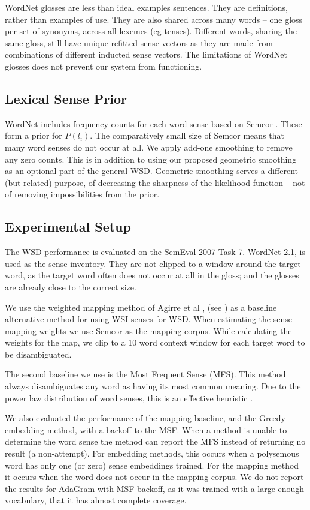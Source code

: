 \documentclass{llncs}
\def\parencite{\cite}
\begin{document}
WordNet glosses are less than ideal examples sentences.
They are definitions, rather than examples of use.
They are also shared across many words -- one gloss per set of synonyms, across all lexemes (eg tenses).
Different words, sharing the same gloss, still have unique refitted sense vectors as they are made from combinations of different inducted sense vectors.
The limitations of WordNet glosses does not prevent our system from functioning.

\subsection{Lexical Sense Prior}
WordNet includes frequency counts for each word sense based on Semcor \parencite{tengi1998design}.
These form a prior for $P(l_i)$.
The comparatively small size of Semcor means that many word senses do not occur at all.
We apply add-one smoothing to remove any zero counts.
This is in addition to using our proposed geometric smoothing as an optional part of the general WSD.
Geometric smoothing serves a different (but related) purpose, of decreasing the sharpness of the likelihood function -- not of removing impossibilities from the prior.

\subsection {Experimental Setup}
The WSD performance is evaluated on the SemEval 2007 Task 7. 
WordNet 2.1, is used as the sense inventory.
They are not clipped to a window around the target word, as the target word often does not occur at all in the gloss; and the glosses are already close to the correct size.

We use the weighted mapping method of Agirre et al \parencite{agirre2006}, (see ) as a baseline alternative method for using WSI senses for WSD.
When estimating the sense mapping weights we use Semcor as the mapping corpus.
While calculating the weights for the map, we clip to a 10 word context window for each target word to be disambiguated.

The second baseline we use is the Most Frequent Sense (MFS).
This method always disambiguates any word as having its  most common meaning.
Due to the power law distribution of word senses, this is an effective heuristic \parencite{Kilgarriff2004}.

We also evaluated the performance of the mapping baseline, and the Greedy embedding method, with a backoff to the MSF.
When a method is unable to determine the word sense the method can report the MFS instead of returning no result (a non-attempt).
For embedding methods, this occurs when a polysemous word has only one (or zero) sense embeddings trained.
For the mapping method it occurs when the word does not occur in the mapping corpus.
We do not report the results for AdaGram with MSF backoff, as it was trained with a large enough vocabulary, that it has almost complete coverage.
\end{document}
